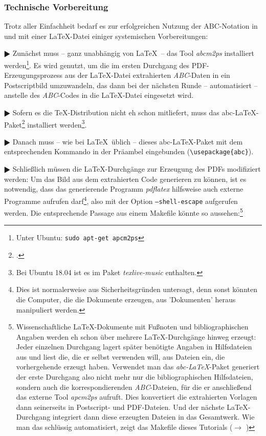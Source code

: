 \subsubsection{Technische Vorbereitung}

Trotz aller Einfachheit bedarf es zur erfolgreichen Nutzung der ABC-Notation
in und mit einer \LaTeX-Datei einiger systemischen Vorbereitungen:

$\RHD$ Zunächst muss -- ganz unabhängig von \LaTeX\ -- das Tool \textit{abcm2ps}
installiert werden\footnote{Unter Ubuntu: \texttt{sudo apt-get apcm2ps}}. Es
wird genutzt, um die im  ersten Durchgang des PDF-Erzeugungsprozess aus der
\LaTeX-Datei extrahierten \textit{ABC}-Daten in ein Postscriptbild
umzuwandeln, das dann bei der nächsten Runde -- automatisiert -- anstelle des
\textit{ABC}-Codes in die \LaTeX-Datei eingesetzt wird.
  
$\RHD$ Sofern es die \TeX-Distribution nicht eh schon mitliefert, muss das
abc-\LaTeX-Paket\footcite[vgl.][\nopage wp]{CtanAbc2018a} installiert
werden\footnote{Bei Ubuntu 18.04 ist es im Paket \textit{texlive-music} enthalten.}.
  
$\RHD$ Danach muss -- wie bei \LaTeX\ üblich -- dieses
abc-\LaTeX-Paket  mit dem entsprechenden Kommando in der Präambel
eingebunden (\texttt{\textbackslash{usepackage}\{abc\}}).
  
$\RHD$ Schließlich müssen die \LaTeX-Durchgänge zur Erzeugung des PDFs
modifiziert werden: Um das Bild aus dem extrahierten Code generieren zu können,
ist es notwendig, dass das generierende Programm \textit{pdflatex} hilfsweise auch
externe Programme aufrufen darf\footnote{Dies ist normalerweise aus
Sicherheitsgründen untersagt, denn sonst könnten die Computer, die die Dokumente
erzeugen, aus 'Dokumenten' heraus manipuliert werden.}, also mit der Option
\texttt{--shell-escape} aufgerufen werden. Die entsprechende Passage aus einem
Makefile könnte so aussehen:\footnote{Wissenschaftliche \LaTeX-Dokumente
mit Fußnoten und bibliographischen Angaben werden eh schon über mehrere
\LaTeX-Durchgänge hinweg erzeugt: Jeder einzelnen Durchgang lagert später
benötigte Angaben in Hilfsdateien aus und liest die, die er selbst verwenden
will, aus Dateien ein, die vorhergehende erzeugt haben.
Verwendet man das \textit{abc-LaTeX}-Paket generiert der erste Durchgang also
nicht mehr nur die bibliographischen Hilfsdateien, sondern auch die
korrespondierenden \textit{ABC}-Dateien, für die er anschließend das externe Tool
\textit{apcm2ps} aufruft. Dies konvertiert die extrahierten Vorlagen dann
seinerseits in Postscript- und PDF-Dateien. Und der nächste
\LaTeX-Durchgang integriert dann diese erzeugten Dateien in das
Gesamtwerk. Wie man das schlüssig automatisiert, zeigt das Makefile dieses
Tutorials ($\rightarrow$
) } 

